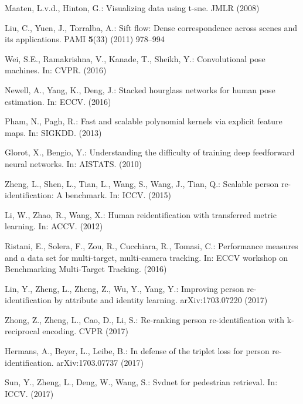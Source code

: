 \documentclass{llncs}
\begin{document}
\begin{thebibliography}{10}
Maaten, L.v.d., Hinton, G.:
\newblock Visualizing data using t-sne.
\newblock JMLR (2008)

Liu, C., Yuen, J., Torralba, A.:
\newblock Sift flow: Dense correspondence across scenes and its applications.
\newblock PAMI \textbf{5}(33) (2011)  978--994

Wei, S.E., Ramakrishna, V., Kanade, T., Sheikh, Y.:
\newblock Convolutional pose machines.
\newblock In: CVPR. (2016)

Newell, A., Yang, K., Deng, J.:
\newblock Stacked hourglass networks for human pose estimation.
\newblock In: ECCV. (2016)

Pham, N., Pagh, R.:
\newblock Fast and scalable polynomial kernels via explicit feature maps.
\newblock In: SIGKDD. (2013)

Glorot, X., Bengio, Y.:
\newblock Understanding the difficulty of training deep feedforward neural
  networks.
\newblock In: AISTATS. (2010)

Zheng, L., Shen, L., Tian, L., Wang, S., Wang, J., Tian, Q.:
\newblock Scalable person re-identification: A benchmark.
\newblock In: ICCV. (2015)

Li, W., Zhao, R., Wang, X.:
\newblock Human reidentification with transferred metric learning.
\newblock In: ACCV. (2012)

Ristani, E., Solera, F., Zou, R., Cucchiara, R., Tomasi, C.:
\newblock Performance measures and a data set for multi-target, multi-camera
  tracking.
\newblock In: ECCV workshop on Benchmarking Multi-Target Tracking. (2016)

Lin, Y., Zheng, L., Zheng, Z., Wu, Y., Yang, Y.:
\newblock Improving person re-identification by attribute and identity
  learning.
\newblock arXiv:1703.07220 (2017)

Zhong, Z., Zheng, L., Cao, D., Li, S.:
\newblock Re-ranking person re-identification with k-reciprocal encoding.
\newblock CVPR (2017)

Hermans, A., Beyer, L., Leibe, B.:
\newblock In defense of the triplet loss for person re-identification.
\newblock arXiv:1703.07737 (2017)

Sun, Y., Zheng, L., Deng, W., Wang, S.:
\newblock Svdnet for pedestrian retrieval.
\newblock In: ICCV. (2017)


\end{thebibliography}
\end{document}
